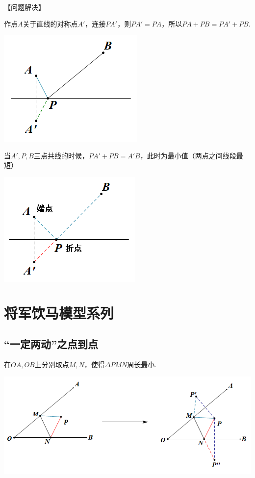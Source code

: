 \documentclass[10pt]{ctexart}
\begin{document}
【问题解决】

作点$A$关于直线的对称点$A'$，连接$PA'$，则$PA'=PA$，所以$PA+PB=PA'+PB$.

\includegraphics[scale=0.6]{figure/1-3.PNG} 

当$A',P,B$三点共线的时候，$PA'+PB=A'B$，此时为最小值（两点之间线段最短）

\includegraphics[scale=0.6]{figure/1-4.PNG} 

\section{将军饮马模型系列}
\subsection{“一定两动”之点到点}
在$OA,OB$上分别取点$M,N$，使得$\Delta PMN$周长最小.

\includegraphics[scale=0.6]{figure/2-1.PNG}
 
\end{document}
